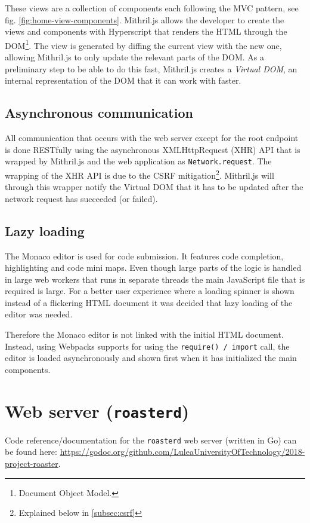 \documentclass[12pt,a4paper]{report}
\begin{document}
These views are a collection of components each following the MVC pattern, see fig. \ref{fig:home-view-components}. Mithril.js allows the developer to create the views and components with Hyperscript that renders the HTML through the DOM\footnote{Document Object Model.}. The view is generated by diffing the current view with the new one, allowing Mithril.js to only update the relevant parts of the DOM. As a preliminary step to be able to do this fast, Mithril.js creates a \textit{Virtual DOM}, an internal representation of the DOM that it can work with faster.

\subsection{Asynchronous communication}
All communication that occurs with the web server except for the root endpoint is done RESTfully using the asynchronous XMLHttpRequest (XHR) API that is wrapped by Mithril.js and the web application as \texttt{Network.request}. The wrapping of the XHR API is due to the CSRF mitigation\footnote{Explained below in \autoref{subsec:csrf}}. Mithril.js will through this wrapper notify the Virtual DOM that it has to be updated after the network request has succeeded (or failed).

\subsection{Lazy loading}
\label{sec:lazy-loading}
The Monaco editor is used for code submission. It features code completion, highlighting and code mini maps. Even though large parts of the logic is handled in large web workers that runs in separate threads the main JavaScript file that is required is large. For a better user experience where a loading spinner is shown instead of a flickering HTML document it was decided that lazy loading of the editor was needed.

Therefore the Monaco editor is not linked with the initial HTML document. Instead, using Webpacks supports for using the \texttt{require() / import} call, the editor is loaded asynchronously and shown first when it has initialized the main components.

\section{Web server (\texttt{roasterd})}
Code reference/documentation for the \texttt{roasterd} web server (written in Go) can be found here: \url{https://godoc.org/github.com/LuleaUniversityOfTechnology/2018-project-roaster}.
\end{document}

